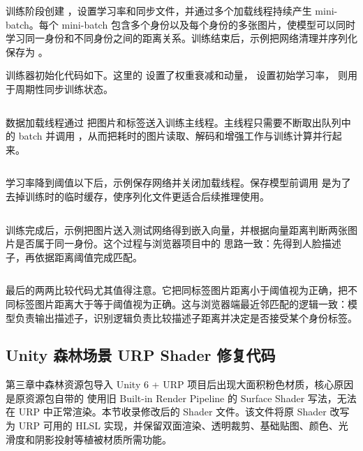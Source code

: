 训练阶段创建 ，设置学习率和同步文件，并通过多个加载线程持续产生 mini-batch。每个 mini-batch 包含多个身份以及每个身份的多张图片，使模型可以同时学习同一身份和不同身份之间的距离关系。训练结束后，示例把网络清理并序列化保存为 。

训练器初始化代码如下。这里的  设置了权重衰减和动量， 设置初始学习率， 则用于周期性同步训练状态。

\inputminted[firstline=218,lastline=227,firstnumber=218]{cpp}{code/dlib/examples/dnn_metric_learning_on_images_ex.cpp}

数据加载线程通过  把图片和标签送入训练主线程。主线程只需要不断取出队列中的 batch 并调用 ，从而把耗时的图片读取、解码和增强工作与训练计算并行起来。

\inputminted[firstline=229,lastline=272,firstnumber=229]{cpp}{code/dlib/examples/dnn_metric_learning_on_images_ex.cpp}

学习率降到阈值以下后，示例保存网络并关闭加载线程。保存模型前调用  是为了去掉训练时的临时缓存，使序列化文件更适合后续推理使用。

\inputminted[firstline=274,lastline=289,firstnumber=274]{cpp}{code/dlib/examples/dnn_metric_learning_on_images_ex.cpp}

训练完成后，示例把图片送入测试网络得到嵌入向量，并根据向量距离判断两张图片是否属于同一身份。这个过程与浏览器项目中的  思路一致：先得到人脸描述子，再依据距离阈值完成匹配。

\inputminted[firstline=295,lastline=338,firstnumber=295]{cpp}{code/dlib/examples/dnn_metric_learning_on_images_ex.cpp}

最后的两两比较代码尤其值得注意。它把同标签图片距离小于阈值视为正确，把不同标签图片距离大于等于阈值视为正确。这与浏览器端最近邻匹配的逻辑一致：模型负责输出描述子，识别逻辑负责比较描述子距离并决定是否接受某个身份标签。

\subsection*{Unity 森林场景 URP Shader 修复代码}

第三章中森林资源包导入 Unity 6 + URP 项目后出现大面积粉色材质，核心原因是原资源包自带的  使用旧 Built-in Render Pipeline 的 Surface Shader 写法，无法在 URP 中正常渲染。本节收录修改后的 Shader 文件。该文件将原 Shader 改写为 URP 可用的 HLSL 实现，并保留双面渲染、透明裁剪、基础贴图、颜色、光滑度和阴影投射等植被材质所需功能。

